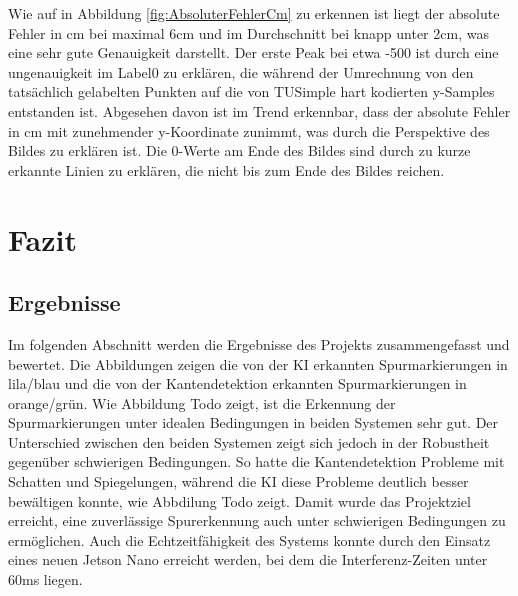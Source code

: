 \documentclass{article}
\begin{document}
            Wie auf in Abbildung \ref{fig:AbsoluterFehlerCm} zu erkennen ist liegt der absolute Fehler in cm bei maximal 6cm und im Durchschnitt bei knapp unter 2cm, was eine sehr gute Genauigkeit darstellt.
            Der erste Peak bei etwa -500 ist durch eine ungenauigkeit im Label0 zu erklären, die während der Umrechnung von den tatsächlich gelabelten Punkten auf die von TUSimple hart kodierten y-Samples entstanden ist. 
            Abgesehen davon ist im Trend erkennbar, dass der absolute Fehler in cm mit zunehmender y-Koordinate zunimmt, was durch die Perspektive des Bildes zu erklären ist.
            Die 0-Werte am Ende des Bildes sind durch zu kurze erkannte Linien zu erklären, die nicht bis zum Ende des Bildes reichen.


    \section{Fazit}
        \subsection{Ergebnisse}
        Im folgenden Abschnitt werden die Ergebnisse des Projekts zusammengefasst und bewertet. Die Abbildungen %
        zeigen die von der KI erkannten Spurmarkierungen in lila/blau und die von der Kantendetektion erkannten Spurmarkierungen in orange/grün.
        Wie Abbildung Todo zeigt, ist die Erkennung der Spurmarkierungen unter idealen Bedingungen in beiden Systemen sehr gut.
        Der Unterschied zwischen den beiden Systemen zeigt sich jedoch in der Robustheit gegenüber schwierigen Bedingungen. So hatte die Kantendetektion Probleme mit Schatten und Spiegelungen, während die KI diese Probleme deutlich besser bewältigen konnte, wie Abbdilung Todo zeigt.
        Damit wurde das Projektziel erreicht, eine zuverlässige Spurerkennung auch unter schwierigen Bedingungen zu ermöglichen. Auch die Echtzeitfähigkeit des Systems konnte durch den Einsatz eines neuen Jetson Nano erreicht werden, bei dem die Interferenz-Zeiten unter 60ms liegen.
\end{document}
